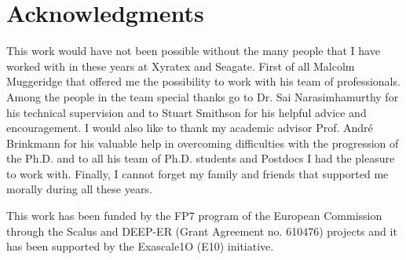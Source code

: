 \documentclass[a4paper,titlepage,oneside,11pt]{book}
\begin{document}
\newpage
\thispagestyle{empty}
\newpage
\newpage
\thispagestyle{empty}
\null
\newpage
{}\setcounter{page}{1}
\tableofcontents
\mainmatter


\setcounter{page}{3}
\chapter*{Acknowledgments}
This work would have not been possible without the many people that I have worked with in these years at Xyratex and Seagate. First of all Malcolm Muggeridge that offered me the possibility to work with his team of professionals.
Among the people in the team special thanks go to Dr. Sai Narasimhamurthy for his technical supervision and to Stuart Smithson for his helpful advice and encouragement. I would also like to thank my academic advisor Prof. Andr\'e 
Brinkmann for his valuable help in overcoming difficulties with the progression of the Ph.D. and to all his team of Ph.D. students and Postdocs I had the pleasure to work with. Finally, I cannot forget my family and friends that 
supported me morally during all these years. 

\vspace{\fill}
This work has been funded by the FP7 program of the European Commission through the Scalus and DEEP-ER (Grant Agreement no. 610476) projects and it has been supported by the Exascale1O (E10) initiative.
\end{document}
